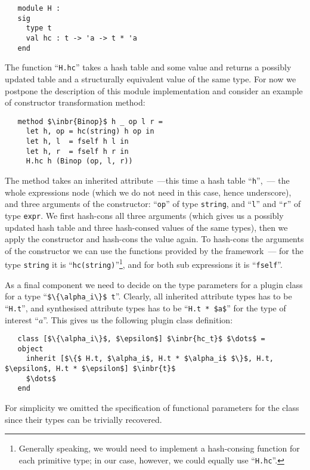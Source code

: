 \begin{lstlisting}
   module H :
   sig
     type t
     val hc : t -> 'a -> t * 'a
   end
\end{lstlisting}

The function ``\lstinline{H.hc}'' takes a hash table and some value and returns a possibly updated table and a structurally equivalent value
of the same type. For now we postpone the description of this module implementation and consider an example of constructor transformation
method:

\begin{lstlisting}   
   method $\inbr{Binop}$ h _ op l r =
     let h, op = hc(string) h op in
     let h, l  = fself h l in
     let h, r  = fself h r in
     H.hc h (Binop (op, l, r))
\end{lstlisting}

The method takes an inherited attribute~---this time a hash table ``\lstinline{h}'',~--- the whole expressions node (which we do not
need in this case, hence underscore), and three arguments of the constructor: ``\lstinline{op}'' of type \lstinline{string}, and
``\lstinline{l}'' and ``\lstinline{r}'' of type \lstinline{expr}. We first hash-cons all three arguments (which gives us a possibly updated
hash table and three hash-consed values of the same types), then we apply the constructor and hash-cons the value again. To hash-cons
the arguments of the constructor we can use the functions provided by the framework~--- for the type \lstinline{string} it is
``\lstinline{hc(string)}''\footnote{Generally speaking, we would need to implement a hash-consing function for each primitive type; in
  our case, however, we could equally use ``\lstinline{H.hc}''.}, and for both sub expressions it is ``\lstinline{fself}''.

As a final component we need to decide on the type parameters for a plugin class for a type ``\lstinline|$\{\alpha_i\}$ t|''. Clearly,
all inherited attribute types has to be ``\lstinline{H.t}'', and synthesised attribute types has to be ``\lstinline{H.t * $a$}'' for the
type of interest ``$a$''. This gives us the following plugin class definition:

\begin{lstlisting}
   class [$\{\alpha_i\}$, $\epsilon$] $\inbr{hc_t}$ $\dots$ =
   object
     inherit [$\{$ H.t, $\alpha_i$, H.t * $\alpha_i$ $\}$, H.t, $\epsilon$, H.t * $\epsilon$] $\inbr{t}$
     $\dots$
   end
\end{lstlisting}

For simplicity we omitted the specification of functional parameters for the class since their types can be trivially
recovered.

